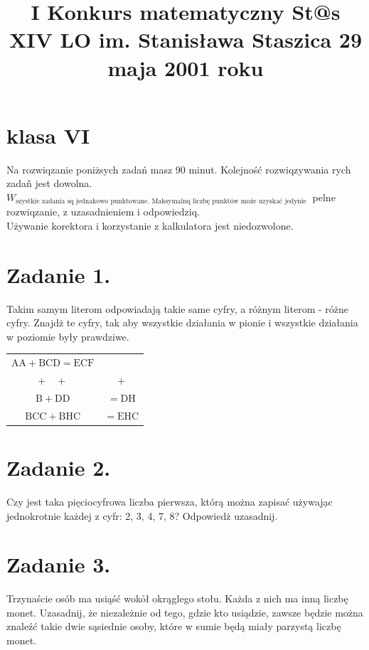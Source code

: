 \documentclass[10pt]{article}
\title{I Konkurs matematyczny St@s \\
 XIV LO im. Stanisława Staszica 29 maja 2001 roku }
\author{}
\date{}
\begin{document}
\maketitle
\section*{klasa VI}
Na rozwiqzanie poniżsych zadań masz 90 minut. Kolejność rozwiqzywania rych zadañ jest dowolna.\\
\(W_{\text {szystkie zadania sq jednakowo punktowane. Maksymalnq liczbę punktów może uzyskać jedynie }}\) pelne rozwiqzanie, z uzasadnieniem i odpowiedziq.\\
Używanie korektora i korzystanie z kalkulatora jest niedozwolone.

\section*{Zadanie 1.}
Takim samym literom odpowiadają takie same cyfry, a różnym literom - różne cyfry. Znajdż te cyfry, tak aby wszystkie działania w pionie i wszystkie działania w poziomie były prawdziwe.

\begin{center}
\begin{tabular}{cc}
\(\mathrm{AA}+\mathrm{BCD}=\mathrm{ECF}\) &  \\
\(+\quad+\) & + \\
\(\mathrm{B}+\mathrm{DD}\) & \(=\mathrm{DH}\) \\
\hline
\(\mathrm{BCC}+\mathrm{BHC}\) & \(=\mathrm{EHC}\) \\
\hline
\end{tabular}
\end{center}

\section*{Zadanie 2.}
Czy jest taka pięciocyfrowa liczba pierwsza, którą można zapisać używajạc jednokrotnie każdej z cyfr: 2, 3, 4, 7, 8? Odpowiedż uzasadnij.

\section*{Zadanie 3.}
Trzynaście osób ma usiąść wokỏł okrąglego stołu. Każda z nich ma inną liczbę monet. Uzasadnij, że niezależnie od tego, gdzie kto usiądzie, zawsze będzie można znaleźć takie dwie sąsiednie osoby, które w sumie będą miały parzystą liczbę monet.
\end{document}
